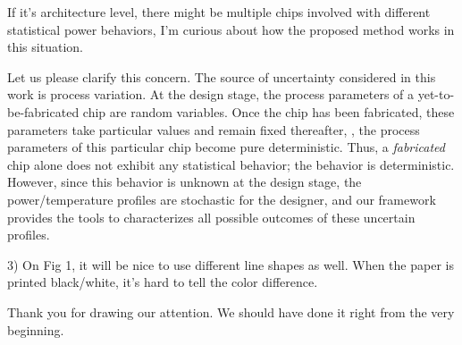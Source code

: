 \begin{reviewer}
If it’s architecture level, there might be multiple chips involved with different statistical power behaviors, I’m curious about how the proposed method works in this situation.
\end{reviewer}
\begin{authors}
Let us please clarify this concern.
The source of uncertainty considered in this work is process variation.
At the design stage, the process parameters of a yet-to-be-fabricated chip are random variables.
Once the chip has been fabricated, these parameters take particular values and remain fixed thereafter, \ie, the process parameters of this particular chip become pure deterministic.
Thus, a \emph{fabricated} chip alone does not exhibit any statistical behavior; the behavior is deterministic.
However, since this behavior is unknown at the design stage, the power/temperature profiles are stochastic for the designer, and our framework provides the tools to characterizes all possible outcomes of these uncertain profiles.

\begin{actions}
\end{actions}
\end{authors}

\begin{reviewer}
3) On Fig 1, it will be nice to use different line shapes as well. When the paper is printed black/white, it’s hard to tell the color difference.
\end{reviewer}
\begin{authors}
Thank you for drawing our attention.
We should have done it right from the very beginning.

\begin{actions}
\end{actions}
\end{authors}
